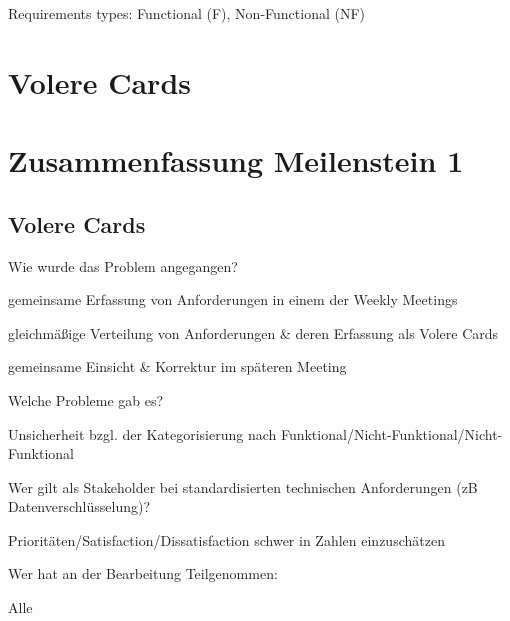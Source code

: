 \documentclass{article}
\begin{document}
Requirements types: Functional (F), Non-Functional (NF)
\section{Volere Cards}



















\section{Zusammenfassung Meilenstein 1}

\subsection{Volere Cards}
\begin{description}[font=$\bullet$]
  \item Wie wurde das Problem angegangen?
        \begin{description}[font=$\bullet$]
          \item gemeinsame Erfassung von Anforderungen in einem der Weekly Meetings
          \item gleichmäßige Verteilung von Anforderungen \& deren Erfassung als Volere Cards
          \item gemeinsame Einsicht \& Korrektur im späteren Meeting
        \end{description}


  \item Welche Probleme gab es?

        \begin{description}[font=$\bullet$]
          \item Unsicherheit bzgl. der Kategorisierung nach Funktional/Nicht-Funktional/Nicht-Funktional
          \item Wer gilt als Stakeholder bei standardisierten technischen Anforderungen (zB Datenverschlüsselung)?
          \item Prioritäten/Satisfaction/Dissatisfaction schwer in Zahlen einzuschätzen
        \end{description}

  \item Wer hat an der Bearbeitung Teilgenommen:
        \begin{description}[font=$\bullet$]
          \item Alle
        \end{description}
\end{description}
\end{document}
